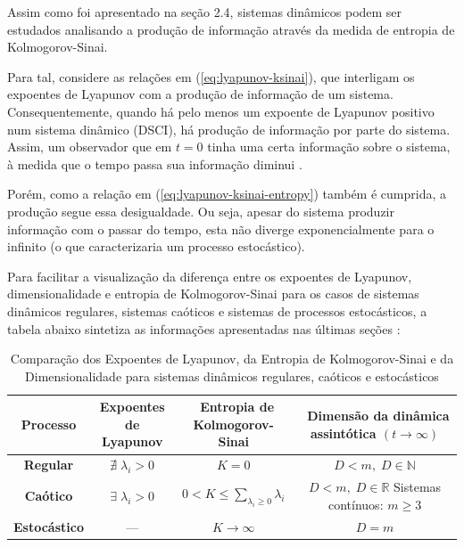 \documentclass[a4paper, 12pt]{article}
\begin{document}
Assim como foi apresentado na seção 2.4, sistemas dinâmicos podem ser estudados analisando a produção de informação através da medida de entropia de Kolmogorov-Sinai.

Para tal, considere as relações em (\ref{eq:lyapunov-ksinai}), que interligam os expoentes de Lyapunov com a produção de informação de um sistema. Consequentemente, quando há pelo menos um expoente de Lyapunov positivo num sistema dinâmico (DSCI), há produção de informação por parte do sistema. Assim, um observador que em $t=0$ tinha uma certa informação sobre o sistema, à medida que o tempo passa sua informação diminui \cite{fiedler1994caos}. 

Porém, como a relação em (\ref{eq:lyapunov-ksinai-entropy}) também é cumprida, a produção segue essa desigualdade. Ou seja, apesar do sistema produzir informação com o passar do tempo, esta não diverge exponencialmente para o infinito (o que caracterizaria um processo estocástico).

Para facilitar a visualização da diferença entre os expoentes de Lyapunov, dimensionalidade e entropia de Kolmogorov-Sinai para os casos de sistemas dinâmicos regulares, sistemas caóticos e sistemas de processos estocásticos, a tabela abaixo sintetiza as informações apresentadas nas últimas seções \cite{fiedler1994caos}:
\begin{table}[!ht]
\begin{center}
\begin{tabular}{c  c  c  c }
  \textbf{Processo}  & \pbox{3cm}{\centering \textbf{Expoentes de\newline Lyapunov}} & \pbox{4cm}{\centering \textbf{\;\, Entropia de\newline Kolmogorov-Sinai}} & \pbox{5cm}{\centering \textbf{\;\, Dimensão da\newline dinâmica assintótica}\newline $(t\rightarrow \infty)$} \\
 \hline
 \textbf{Regular} & $\nexists\;  \lambda_i > 0$ & $K = 0$ & $D < m, \; D\in \mathbb{N}$ \\  
  \addlinespace
 \textbf{Caótico} & $\exists\; \lambda_i > 0$ & $0 < K \leq \sum_{\lambda_i \geq 0} \lambda_i$ & \pbox{5cm}{\centering $D < m, \; D\in \mathbb{R}$ \newline Sistemas contínuos: $m \geq 3$}\\   
  \addlinespace
 \textbf{Estocástico} & --- & $K \rightarrow \infty$ & $D=m$ 
\end{tabular}
\caption{Comparação dos Expoentes de Lyapunov, da Entropia de Kolmogorov-Sinai e da Dimensionalidade para sistemas dinâmicos regulares, caóticos e estocásticos}
\end{center}
\end{table}
\end{document}
